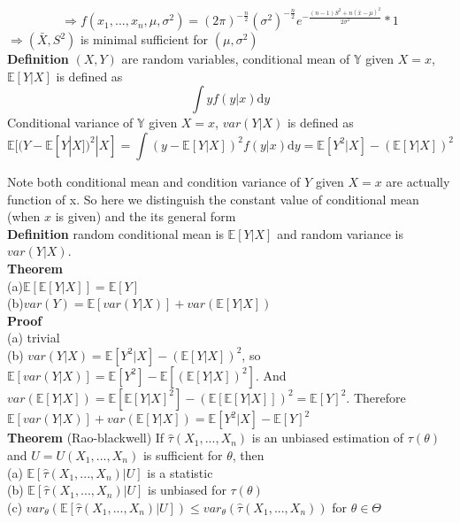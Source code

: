 \documentclass[a4paper,12pt]{article}
\begin{document}
$$\Rightarrow f(x_1, ..., x_n, \mu, \sigma^2 ) = (2\pi)^{-\frac{n}{2}}(\sigma^2)^{-\frac{n}{2}}e^{-\frac{(n-1)S^2+n(\bar{x}-\mu)^2}{2\sigma^2}} * 1$$
$\Rightarrow (\bar{X}, S^2) $ is minimal sufficient for $ (\mu, \sigma^2) $\\

\textbf{Definition} $(X, Y)$ are random variables, conditional mean of $\mathbb{Y}$ given $X=x$, $\mathbb{E}[Y|X]$ is defined as
$$\int yf(y|x) \mathrm{d}y$$
Conditional variance of $\mathbb{Y}$ given $X=x$, $var(Y|X)$ is defined as
$$\mathbb{E}[ (Y - \mathbb{E}[Y|X])^2 |X ] = \int (y-\mathbb{E}[Y|X])^2 f(y|x) \mathrm{d}y = 
\mathbb{E}[ Y^2 |X ] - (\mathbb{E}[Y|X])^2$$

Note both conditional mean and condition variance of $Y$ given $X=x$ are actually function of x. So here we distinguish the constant value of conditional mean (when $x$ is given) and the its general form\\

\textbf{Definition} random conditional mean is $\mathbb{E}[Y|X]$ and random variance is $var(Y|X)$.\\

\textbf{Theorem}\\
(a)$\mathbb{E}[\mathbb{E}[Y|X]] = \mathbb{E}[Y]$\\
(b)$var(Y) = \mathbb{E}[var(Y|X)]+var(\mathbb{E}[Y|X])$\\

\textbf{Proof}\\
(a) trivial\\
(b) $var(Y|X) = \mathbb{E}[ Y^2 |X ] - (\mathbb{E}[Y|X])^2$, so $\mathbb{E}[var(Y|X)] = \mathbb{E}[Y^2] - \mathbb{E}[(\mathbb{E}[Y|X])^2]$. And $var(\mathbb{E}[Y|X]) = \mathbb{E}[ \mathbb{E}[Y|X]^2 ] - (\mathbb{E}[\mathbb{E}[Y|X]])^2 = \mathbb{E}[Y]^2$. Therefore $\mathbb{E}[var(Y|X)]+var(\mathbb{E}[Y|X]) = \mathbb{E}[ Y^2 |X ] - \mathbb{E}[Y]^2$\\

\textbf{Theorem} (Rao-blackwell) If $\hat{\tau}(X_1, ..., X_n)$ is an unbiased estimation of $\tau(\theta)$ and $U = U(X_1, ..., X_n)$ is sufficient for $\theta$, then\\
(a) $\mathbb{E}[ \hat{\tau}(X_1, ..., X_n) | U ]$ is a statistic\\
(b) $\mathbb{E}[ \hat{\tau}(X_1, ..., X_n) | U ]$ is unbiased for $\tau(\theta)$\\
(c) $var_\theta( \mathbb{E}[ \hat{\tau}(X_1, ..., X_n) | U ] )\leq var_\theta( \hat{\tau}(X_1, ..., X_n) )$ for $\theta\in\Theta$\\
\end{document}

